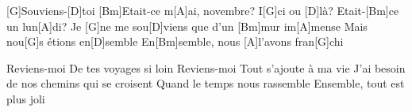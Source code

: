 [G]Souviens-[D]toi 
[Bm]Etait-ce m[A]ai, novembre?
I[G]ci ou [D]là? 
Etait-[Bm]ce un lun[A]di? 
Je [G]ne me sou[D]viens que d'un [Bm]mur im[A]mense 
Mais nou[G]s étions en[D]semble
En[Bm]semble, nous [A]l'avons fran[G]chi

Reviens-moi
De tes voyages si loin
Reviens-moi
Tout s'ajoute à ma vie
J'ai besoin de nos chemins qui se croisent
Quand le temps nous rassemble
Ensemble, tout est plus joli
